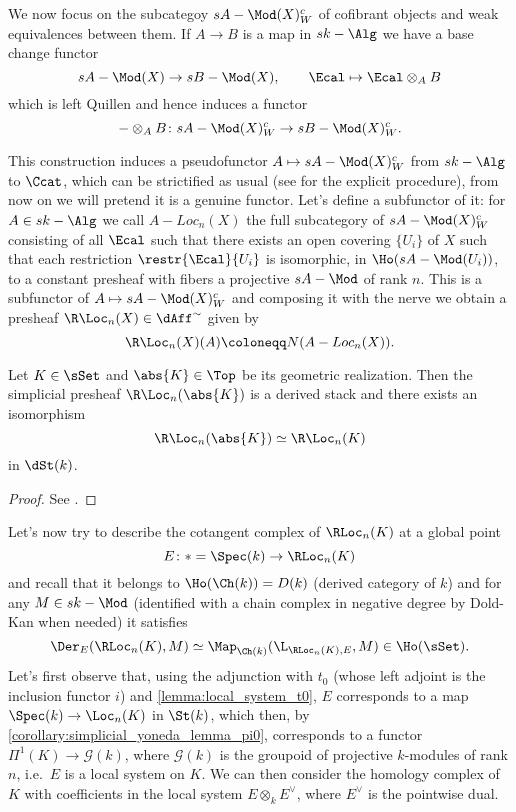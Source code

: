             We now focus on the subcategoy $sA-\Mod(X)^c_W$ of cofibrant objects and weak equivalences between them. If $A \to B$ is a map in $sk-\Alg$ we have a base change functor \[sA-\Mod(X) \to sB-\Mod(X), \qquad \Ecal \mapsto \Ecal \otimes_A B \] which is left Quillen and hence induces a functor \[- \otimes_A B\colon sA-\Mod(X)^c_W \to sB-\Mod(X)^c_W. \] 

            This construction induces a pseudofunctor $A \mapsto sA-\Mod(X)^c_W$ from $sk-\Alg$ to $\Ccat$, which can be strictified as usual (see \cite{Hennion:memoire} for the explicit procedure), from now on we will pretend it is a genuine functor. Let's define a subfunctor of it: for $A \in sk-\Alg$ we call $A-Loc_n(X)$ the full subcategory of $sA-\Mod(X)^c_W$ consisting of all $\Ecal$ such that there exists an open covering $\{U_i\}$ of $X$ such that each restriction $\restr{\Ecal}{U_i}$ is isomorphic, in $\Ho(sA-\Mod(U_i))$, to a constant presheaf with fibers a projective $sA-\Mod$ of rank $n$. This is a subfunctor of $A \mapsto sA-\Mod(X)^c_W$ and composing it with the nerve we obtain a presheaf $\R\Loc_n(X) \in \dAff^{\sim}$ given by \[\R\Loc_n(X)(A) \coloneqq N(A-Loc_n(X)). \]
            \begin{prop}
                \label{prop:local_system_topological}
                Let $K \in \sSet$ and $\abs{K} \in \Top$ be its geometric realization. Then the simplicial presheaf $\R\Loc_n(\abs{K})$ is a derived stack and there exists an isomorphism \[\R\Loc_n(\abs{K}) \simeq \R\Loc_n(K) \] in $\dSt(k)$.
            \end{prop}
            \begin{proof}
                See \cite[Proposition~2.2.6.5]{ToVe:hag2}. %
            \end{proof}

            Let's now try to describe the cotangent complex of $\RLoc_n(K)$ at a global point \[E\colon * = \Spec(k) \to \RLoc_n(K) \] and recall that it belongs to $\Ho(\Ch(k)) = D(k)$ (derived category of $k$) and for any $M \in sk-\Mod$ (identified with a chain complex in negative degree by Dold-Kan when needed) it satisfies \[\Der_E(\RLoc_n(K), M) \simeq \Map_{\Ch(k)}(\L_{\RLoc_n(K), E}, M) \in \Ho(\sSet).  \]
            Let's first observe that, using the adjunction with $t_0$ (whose left adjoint is the inclusion functor $i$) and \cref{lemma:local_system_t0}, $E$ corresponds to a map $\Spec(k) \to \Loc_n(K)$ in $\St(k)$, which then, by \cref{corollary:simplicial_yoneda_lemma_pi0}, corresponds to a functor $\Pi^1(K) \to \mathcal{G}(k)$, where $\mathcal{G}(k)$ is the groupoid of projective $k$-modules of rank $n$, i.e.\ $E$ is a local system on $K$.
            We can then consider the homology complex of $K$ with coefficients in the local system $E \otimes_k E^{\vee}$, where $E^{\vee}$ is the pointwise dual.

